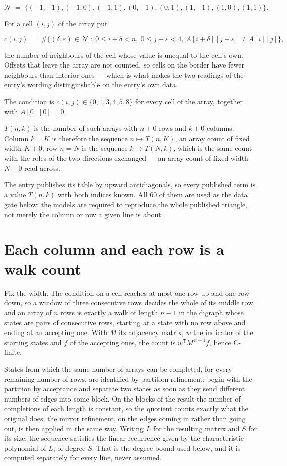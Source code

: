 \documentclass[11pt]{article}
\theoremstyle{definition}
\begin{document}
\[\mathcal{N} \;=\; \{(-1,-1), (-1,0), (-1,1), (0,-1), (0,1), (1,-1), (1,0), (1,1)\}.\]

For a cell $(i,j)$ of the array put

\[c(i,j) \;=\; \#\bigl\{(\delta,\varepsilon)\in\mathcal{N} \;:\; 0\le i+\delta<n,\ 0\le j+\varepsilon<4,\ A[i+\delta][j+\varepsilon] \neq A[i][j]\bigr\},\]

the number of neighbours of the cell whose value is unequal to the cell's own. Offsets that leave the array are not counted, so cells on the border have fewer neighbours than interior ones --- which is what makes the two readings of the entry's wording distinguishable on the entry's own data.

The condition is $c(i,j) \in \{0, 1, 3, 4, 5, 8\}$ for every cell of the array, together with $A[0][0]=0$.

$T(n,k)$ is the number of such arrays with $n + 0$ rows and $k + 0$ columns. Column $k = K$ is therefore the sequence $n \mapsto T(n,K)$, an array count of fixed width $K + 0$; row $n = N$ is the sequence $k \mapsto T(N,k)$, which is the same count with the roles of the two directions exchanged --- an array count of fixed width $N + 0$ read across.

The entry publishes its table by upward antidiagonals, so every published term is a value $T(n,k)$ with both indices known. All 60 of them are used as the data gate below: the models are required to reproduce the whole published triangle, not merely the column or row a given line is about.

\section{Each column and each row is a walk count}

Fix the width. The condition on a cell reaches at most one row up and one row down, so a window of three consecutive rows decides the whole of its middle row, and an array of $n$ rows is exactly a walk of length $n-1$ in the digraph whose states are pairs of consecutive rows, starting at a state with no row above and ending at an accepting one. With $M$ its adjacency matrix, $w$ the indicator of the starting states and $f$ of the accepting ones, the count is $w^{\mathsf T}M^{\,n-1}f$, hence C-finite.

States from which the same number of arrays can be completed, for every remaining number of rows, are identified by partition refinement: begin with the partition by acceptance and separate two states as soon as they send different numbers of edges into some block. On the blocks of the result the number of completions of each length is constant, so the quotient counts exactly what the original does; the mirror refinement, on the edges coming in rather than going out, is then applied in the same way. Writing $L$ for the resulting matrix and $S$ for its size, the sequence satisfies the linear recurrence given by the characteristic polynomial of $L$, of degree $S$. That is the degree bound used below, and it is computed separately for every line, never assumed.
\end{document}
